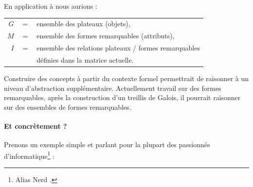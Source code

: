 En application à \cogito{} nous aurions :

\begin{tabular}{r c l}
$G$ & $ = $ & ensemble des plateaux (objets),\\
$M$ & $ = $ & ensemble des formes remarquables (attributs),\\
$I$ & $ = $ & ensemble des relations plateaux / formes remarquables\\
& & définies dans la matrice actuelle.\\
\end{tabular}

Construire des concepts à partir du contexte formel permettrait de raisonner à un niveau d'abstraction supplémentaire. Actuellement \cogito{} travail sur des formes remarquables, après la construction d'un treillis de Galois, il pourrait raisonner sur des ensembles de formes remarquables.

\paragraph{Et concrètement ?}Prenons un exemple simple et parlant pour la plupart des passionnés d'informatique\footnote{Alias \og Nerd \fg{}.} : 

